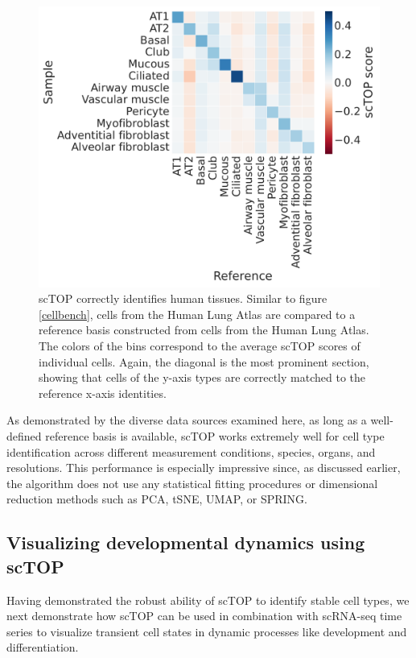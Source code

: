 \documentclass[aps,superscriptaddress, notitlepage,longbibliography]{revtex4-1}
\begin{document}
\begin{figure}
	\centering
		\includegraphics[scale=0.5]{figs/human lung heatmap.pdf}
	\caption{scTOP correctly identifies human tissues. Similar to figure \ref{cellbench}, cells from the Human Lung Atlas are compared to a reference basis constructed from cells from the Human Lung Atlas. The colors of the bins correspond to the average scTOP scores of individual cells. Again, the diagonal is the most prominent section, showing that cells of the y-axis types are correctly matched to the reference x-axis identities.}
	\label{human lung}
\end{figure}

As demonstrated by the diverse data sources examined here, as long as a well-defined reference basis is available, scTOP works extremely well for cell type identification across different measurement conditions, species, organs, and resolutions. This performance is especially impressive since, as discussed earlier, the algorithm does not use any statistical fitting procedures or dimensional reduction methods such as PCA, tSNE, UMAP, or SPRING.

\subsection{Visualizing developmental dynamics using scTOP }
Having demonstrated the robust ability of scTOP to identify stable cell types, we next demonstrate how scTOP can be used in combination with scRNA-seq time series to visualize transient cell states in dynamic processes like development and differentiation. 
\end{document}
